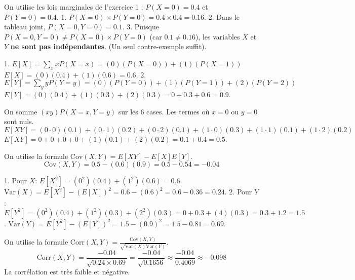 \begin{correctionbox}
On utilise les lois marginales de l'exercice 1 : $P(X=0)=0.4$ et $P(Y=0)=0.4$.
1.  $P(X=0) \times P(Y=0) = 0.4 \times 0.4 = 0.16$.
2.  Dans le tableau joint, $P(X=0, Y=0) = 0.1$.
3.  Puisque $P(X=0, Y=0) \neq P(X=0) \times P(Y=0)$ (car $0.1 \neq 0.16$), les variables $X$ et $Y$ \textbf{ne sont pas indépendantes}. (Un seul contre-exemple suffit).
\end{correctionbox}


\begin{correctionbox}
1.  $E[X] = \sum_x x P(X=x) = (0)(P(X=0)) + (1)(P(X=1))$
    $E[X] = (0)(0.4) + (1)(0.6) = 0.6$.
2.  $E[Y] = \sum_y y P(Y=y) = (0)(P(Y=0)) + (1)(P(Y=1)) + (2)(P(Y=2))$
    $E[Y] = (0)(0.4) + (1)(0.3) + (2)(0.3) = 0 + 0.3 + 0.6 = 0.9$.
\end{correctionbox}

\begin{correctionbox}
On somme $(xy)P(X=x, Y=y)$ sur les 6 cases. Les termes où $x=0$ ou $y=0$ sont nuls.
$E[XY] = (0 \cdot 0)(0.1) + (0 \cdot 1)(0.2) + (0 \cdot 2)(0.1) + (1 \cdot 0)(0.3) + (1 \cdot 1)(0.1) + (1 \cdot 2)(0.2)$
$E[XY] = 0 + 0 + 0 + 0 + (1)(0.1) + (2)(0.2) = 0.1 + 0.4 = 0.5$.
\end{correctionbox}

\begin{correctionbox}
On utilise la formule $\text{Cov}(X,Y) = E[XY] - E[X]E[Y]$.
$$ \text{Cov}(X,Y) = 0.5 - (0.6)(0.9) = 0.5 - 0.54 = -0.04 $$
\end{correctionbox}

\begin{correctionbox}
1.  Pour $X$:
    $E[X^2] = (0^2)(0.4) + (1^2)(0.6) = 0.6$.
    $\text{Var}(X) = E[X^2] - (E[X])^2 = 0.6 - (0.6)^2 = 0.6 - 0.36 = 0.24$.
2.  Pour $Y$:
    $E[Y^2] = (0^2)(0.4) + (1^2)(0.3) + (2^2)(0.3) = 0 + 0.3 + (4)(0.3) = 0.3 + 1.2 = 1.5$.
    $\text{Var}(Y) = E[Y^2] - (E[Y])^2 = 1.5 - (0.9)^2 = 1.5 - 0.81 = 0.69$.
\end{correctionbox}

\begin{correctionbox}
On utilise la formule $\text{Corr}(X,Y) = \frac{\text{Cov}(X,Y)}{\sqrt{\text{Var}(X)\text{Var}(Y)}}$.
$$ \text{Corr}(X,Y) = \frac{-0.04}{\sqrt{0.24 \times 0.69}} = \frac{-0.04}{\sqrt{0.1656}} \approx \frac{-0.04}{0.4069} \approx -0.098 $$
La corrélation est très faible et négative.
\end{correctionbox}

